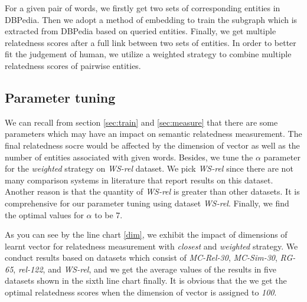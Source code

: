 For a given pair of words, we firstly get two sets of corresponding entities in DBPedia. 
Then we adopt a method of embedding to train the subgraph which is extracted from DBPedia
based on queried entities. Finally,  we get multiple relatedness scores after
a full link between two sets of entities. In order to better fit the judgement of human, we utilize a
weighted strategy to combine multiple relatedness scores of pairwise entities.

\subsection{Parameter tuning}
We can recall from section \ref{sec:train} and \ref{sec:measure} that there are some parameters
which may have an impact on semantic relatedness measurement. The final relatedness
socre would be affected by the dimension of vector as well as the number of entities associated with given words.
Besides, we tune the $\alpha$ parameter for the \emph{weighted} strategy on \emph{WS-rel} dataset.
We pick \emph{WS-rel} since there are not many comparison systems in literature that
report results on this dataset. Another reason is that the quantity of \emph{WS-rel} is
greater than other datasets. It is comprehensive for our parameter tuning using dataset \emph{WS-rel}.
Finally, we find the optimal values for $\alpha$ to be 7.


As you can see by the line chart \ref{dim}, we exhibit the impact of dimensions of learnt
vector for relatedness measurement with \emph{closest} and \emph{weighted} strategy. 
We conduct results based on datasets which consist of
\emph{MC-Rel-30}, \emph{MC-Sim-30}, \emph{RG-65}, \emph{rel-122}, and \emph{WS-rel}, and we get the 
average values of the results in five datasets shown in the sixth line chart finally. It is obvious
that the we get the optimal relatedness scores when the dimension of vector is assigned to \emph{100}.

